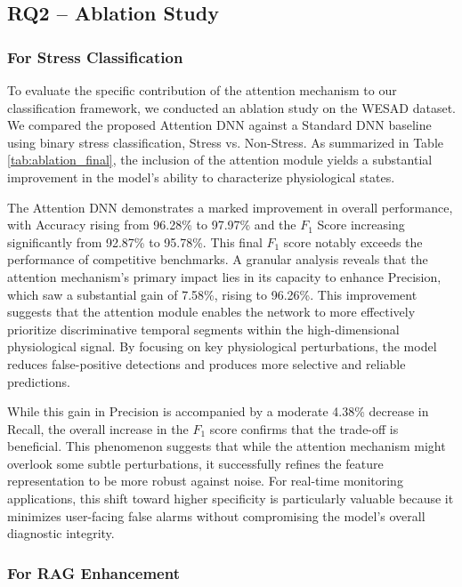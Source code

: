 \subsection{RQ2 -- Ablation Study}

\subsubsection{For Stress Classification}

To evaluate the specific contribution of the attention mechanism to our classification framework, we conducted an ablation study on the WESAD dataset. We compared the proposed Attention DNN against a Standard DNN baseline using binary stress classification, Stress vs. Non-Stress. As summarized in Table \ref{tab:ablation_final}, the inclusion of the attention module yields a substantial improvement in the model's ability to characterize physiological states.

The Attention DNN demonstrates a marked improvement in overall performance, with Accuracy rising from 96.28\% to 97.97\% and the $F_1$ Score increasing significantly from 92.87\% to 95.78\%. This final $F_1$ score notably exceeds the performance of competitive benchmarks. A granular analysis reveals that the attention mechanism's primary impact lies in its capacity to enhance Precision, which saw a substantial gain of 7.58\%, rising to 96.26\%. This improvement suggests that the attention module enables the network to more effectively prioritize discriminative temporal segments within the high-dimensional physiological signal. By focusing on key physiological perturbations, the model reduces false-positive detections and produces more selective and reliable predictions.

While this gain in Precision is accompanied by a moderate 4.38\% decrease in Recall, the overall increase in the $F_1$ score confirms that the trade-off is beneficial. This phenomenon suggests that while the attention mechanism might overlook some subtle perturbations, it successfully refines the feature representation to be more robust against noise. For real-time monitoring applications, this shift toward higher specificity is particularly valuable because it minimizes user-facing false alarms without compromising the model's overall diagnostic integrity.

\subsubsection{For RAG Enhancement}

